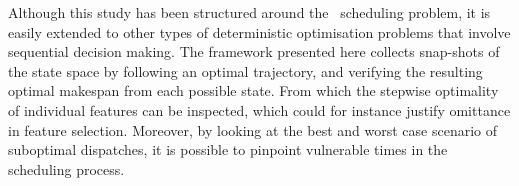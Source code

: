 \documentclass[smallextended]{svjour3}
\begin{document}
Although this study has been structured around the \jsp\ scheduling problem, 
it is easily extended to other types of deterministic optimisation problems 
that involve sequential decision making. 
The framework presented here collects snap-shots of the state space by 
following an optimal trajectory, and verifying the resulting optimal makespan 
from each possible state. 
From which the stepwise optimality of individual features can be inspected, 
which could for instance justify omittance in feature selection. 
Moreover, by looking at the best and worst case scenario of suboptimal 
dispatches, it is possible to pinpoint vulnerable times in the scheduling 
process. 

  

\end{document}
